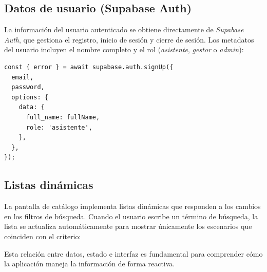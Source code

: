 \subsection{Datos de usuario (Supabase Auth)}

La informaci\'on del usuario autenticado se obtiene directamente de
\textit{Supabase Auth}, que gestiona el registro, inicio de sesi\'on y
cierre de sesi\'on. Los metadatos del usuario incluyen el nombre completo y
el rol (\textit{asistente}, \textit{gestor} o \textit{admin}):

\begin{lstlisting}
const { error } = await supabase.auth.signUp({
  email,
  password,
  options: {
    data: {
      full_name: fullName,
      role: 'asistente',
    },
  },
});
\end{lstlisting}

\subsection{Listas din\'amicas}

La pantalla de cat\'alogo implementa listas din\'amicas que responden a los
cambios en los filtros de b\'usqueda. Cuando el usuario escribe un t\'ermino
de b\'usqueda, la lista se actualiza autom\'aticamente para mostrar
\'unicamente los escenarios que coinciden con el criterio:

\begin{center}
\end{center}

Esta relaci\'on entre datos, estado e interfaz es fundamental para comprender
c\'omo la aplicaci\'on maneja la informaci\'on de forma reactiva.
